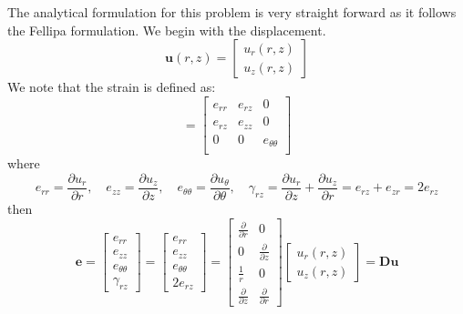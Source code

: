 \documentclass[10pt,letterpaper]{report}
\numberwithin{equation}{chapter}
\begin{document}
The analytical formulation for this problem is very straight forward as it follows the Fellipa formulation.  We begin with the  displacement.
\begin{equation}
\boldsymbol{u}(r,z)= \left[  \begin{array}{c}
u_r(r,z) \\ u_z(r,z)
\end{array} \right]
\end{equation}
We note that the strain is defined as:
\begin{equation}
[\boldsymbol{e}] = \left[ \begin{array}{ccc}
e_{rr} & e_{rz} & 0 \\
e_{rz} & e_{zz} & 0 \\
0 & 0 & e_{\theta \theta} \\
\end{array} \right]
\end{equation}
where
\begin{equation}
e_{rr} = \frac{\partial u_r}{\partial r}, \quad 
e_{zz} = \frac{\partial u_z}{\partial z}, \quad 
e_{\theta \theta} = \frac{\partial u_\theta}{\partial \theta}, \quad 
\gamma_{rz} = \frac{\partial u_r}{\partial z} + \frac{\partial u_z}{\partial r} =
e_{rz} + e_{zr} = 2e_{rz}
\end{equation}
then
\begin{equation}
\boldsymbol{e} =
\left[ \begin{array}{c} e_{rr} \\ e_{zz} \\ e_{\theta \theta} \\ \gamma_{rz} \end{array} \right] = 
\left[ \begin{array}{c} e_{rr} \\ e_{zz} \\ e_{\theta \theta} \\ 2e_{rz} \end{array} \right] = 
\left[ \begin{array}{cc} 
\frac{\partial}{\partial r} & 0 \\
0 & \frac{\partial}{\partial z} \\
\frac{1}{r} & 0 \\
\frac{\partial}{\partial z} & \frac{\partial}{\partial r} 
\end{array} \right]
\left[  \begin{array}{c}
u_r(r,z) \\ u_z(r,z)
\end{array} \right] =
\boldsymbol{Du}
\end{equation}
\end{document}
